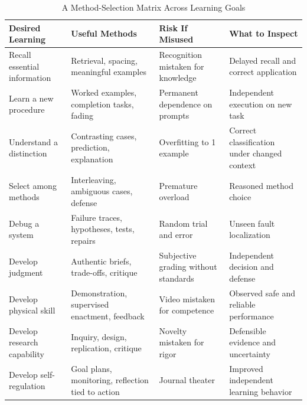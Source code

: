 \begin{table}[t]
\centering
\small
\caption{A Method-Selection Matrix Across Learning Goals}
\begin{tabularx}{\textwidth}{p{}p{}p{}X}
\toprule
\textbf{Desired Learning} & \textbf{Useful Methods} & \textbf{Risk If Misused} & \textbf{What to Inspect} \\
\midrule
Recall essential information & Retrieval, spacing, meaningful examples & Recognition mistaken for knowledge & Delayed recall and correct application \\
Learn a new procedure & Worked examples, completion tasks, fading & Permanent dependence on prompts & Independent execution on new task \\
Understand a distinction & Contrasting cases, prediction, explanation & Overfitting to 1 example & Correct classification under changed context \\
Select among methods & Interleaving, ambiguous cases, defense & Premature overload & Reasoned method choice \\
Debug a system & Failure traces, hypotheses, tests, repairs & Random trial and error & Unseen fault localization \\
Develop judgment & Authentic briefs, trade-offs, critique & Subjective grading without standards & Independent decision and defense \\
Develop physical skill & Demonstration, supervised enactment, feedback & Video mistaken for competence & Observed safe and reliable performance \\
Develop research capability & Inquiry, design, replication, critique & Novelty mistaken for rigor & Defensible evidence and uncertainty \\
Develop self-regulation & Goal plans, monitoring, reflection tied to action & Journal theater & Improved independent learning behavior \\
\bottomrule
\end{tabularx}
\end{table}

